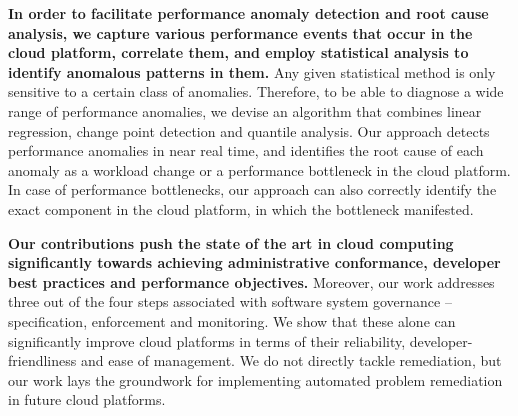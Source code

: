 \textbf{In order to facilitate performance anomaly detection and root cause analysis,
we capture various performance events that occur in the cloud platform,
correlate them, and employ statistical analysis to identify anomalous patterns in them.} Any given statistical
method is only sensitive to a certain class of anomalies. Therefore, to be able to diagnose a wide range of
performance anomalies, we devise an algorithm that combines linear regression, change point
detection and quantile analysis. Our approach detects performance anomalies in near real time,
and identifies the root cause of each anomaly as a workload change or a performance bottleneck
in the cloud platform. In case of performance bottlenecks, our approach can also correctly identify
the exact component in the cloud platform, in which the bottleneck manifested.

\textbf{Our contributions push the state of the art in cloud computing significantly towards achieving
administrative conformance, developer best practices and performance objectives.} Moreover,
our work addresses three out of the four steps associated with software system governance --
specification, enforcement and monitoring. We show that these alone can significantly improve cloud platforms
in terms of their reliability, developer-friendliness and ease of management. 
We do not directly tackle remediation, but our work
lays the groundwork for implementing automated problem remediation in future cloud platforms.
